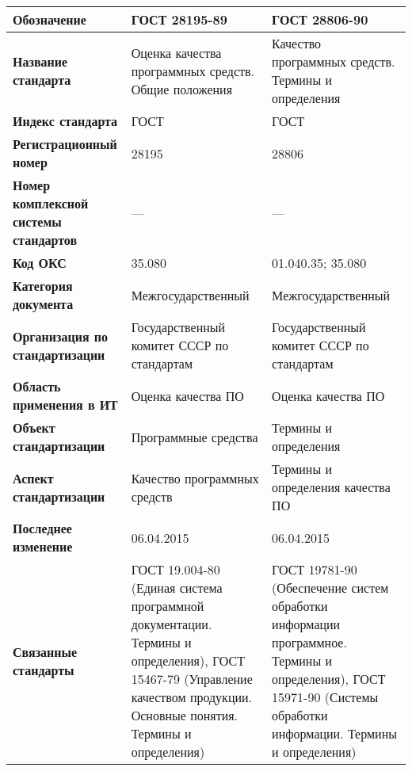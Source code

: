 \begin{table}[h!tp]
	\centering
	\caption{}
	\label{table:interstate}
	\begin{tabular}{|p{10em}|p{12em}|p{12em}|}
		\hline
		\textbf{Обозначение}
			& \textbf{ГОСТ 28195-89} & \textbf{ГОСТ 28806-90} \\ \hline
		\textbf{Название стандарта}
			& Оценка качества программных средств. Общие положения
			& Качество программных средств. Термины и определения \\ \hline
		\textbf{Индекс стандарта} & ГОСТ & ГОСТ \\ \hline
		\textbf{Регистрационный номер} & 28195 & 28806 \\ \hline
		\textbf{Номер комплексной системы стандартов} & --- & --- \\ \hline
		\textbf{Код ОКС} & 35.080 & 01.040.35; 35.080 \\ \hline
		\textbf{Категория документа}
			& Межгосударственный & Межгосударственный \\ \hline
		\textbf{Организация по стандартизации}
			& Государственный комитет СССР по стандартам
			& Государственный комитет СССР по стандартам \\ \hline
		\textbf{Область применения в ИТ}
			& Оценка качества ПО & Оценка качества ПО \\ \hline
		\textbf{Объект стандартизации}
			& Программные средства & Термины и определения \\ \hline
		\textbf{Аспект стандартизации}
			& Качество программных средств
			& Термины и определения качества ПО \\ \hline
		\textbf{Последнее изменение} & 06.04.2015 & 06.04.2015 \\ \hline
		\textbf{Связанные стандарты}
			& ГОСТ 19.004-80 (Единая система программной документации. Термины и определения), ГОСТ 15467-79 (Управление качеством продукции. Основные понятия. Термины и определения)
			& ГОСТ 19781-90 (Обеспечение систем обработки информации программное. Термины и определения), ГОСТ 15971-90 (Системы обработки информации. Термины и определения) \\ \hline
	\end{tabular}
\end{table}

